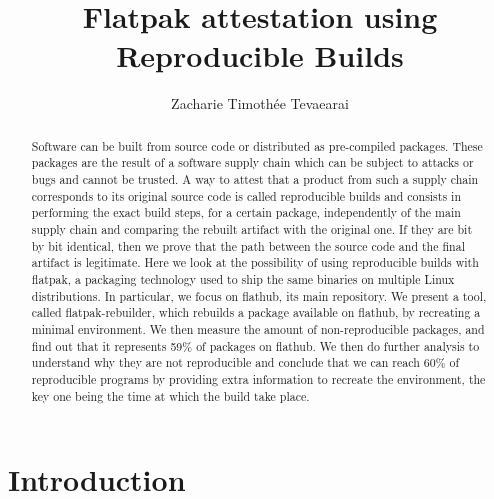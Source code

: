 \documentclass[a4paper,11pt,oneside]{report}
\title{Flatpak attestation using Reproducible Builds}
\author{Zacharie Timothée Tevaearai}
\theoremstyle{definition}
\newcommand{\sysname}{flatpak-rebuilder\xspace}
\newcommand{\rb}{reproducible builds\xspace}
\newcommand{\fp}{flatpak\xspace}
\newcommand{\fh}{flathub\xspace}
\begin{document}
\maketitle

\begin{abstract}
Software can be built from source code or distributed as pre-compiled packages.
These packages are the result of a software supply chain which can be
subject to attacks or bugs and cannot be trusted. A way to attest that a
product from such a supply chain corresponds to its original source code is
called \rb and consists in performing the exact build steps, for a certain
package, independently of the main supply chain and comparing the rebuilt
artifact with the original one. If they are bit by bit identical, then we
prove that the path between the source code and the final artifact is
legitimate. Here we look at the possibility of using reproducible builds
with \fp, a packaging technology used to ship the same binaries on multiple
Linux distributions. In particular, we focus on \fh, its main repository.
We present a tool, called \sysname, which rebuilds a package available on
\fh, by recreating a minimal environment. We then measure the amount of
non-reproducible packages, and find out that it represents 59\% of packages
on \fh. We then do further analysis to understand why they are not
reproducible and conclude that we can reach 60\% of reproducible programs
by providing extra information to recreate the environment, the key one
being the time at which the build take place.
\end{abstract}

\maketoc

\chapter{Introduction}
\end{document}
